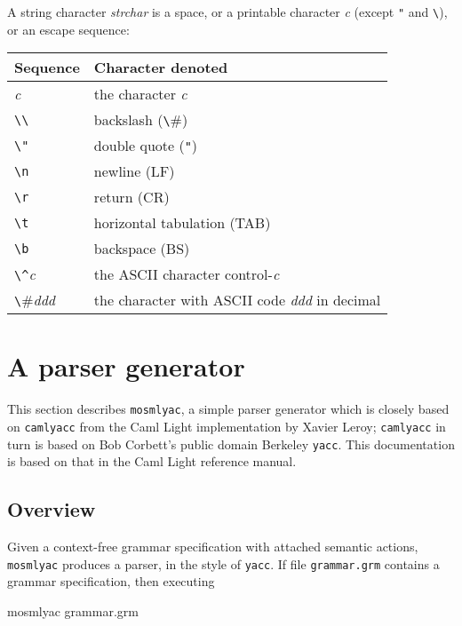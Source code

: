 \documentclass[fleqn]{article}
\begin{document}
\noindent A string character {\it strchar\/} is a space, or a
printable character {\it c\/} (except {\tt "} and \verb#\#), or an
escape sequence:

\begin{quot}
\begin{tabular}{@{}|l|l|}\hline
Sequence & Character denoted \\\hline
{\it c\/}       & the character {\it c\/}\\
\verb#\\#       & backslash (\verb#\#)\\
\verb#\"#       & double quote (\verb#"#)\\
\verb#\n#       & newline (LF)\\
\verb#\r#       & return (CR)\\
\verb#\t#       & horizontal tabulation (TAB)\\
\verb#\b#       & backspace (BS)\\
\verb#\^#{\it c\/}      & the ASCII character control-{\it c\/}\\
\verb#\#{\it ddd\/}     & the character with ASCII code {\it ddd\/} in
decimal\\\hline 
\end{tabular}
\end{quot}

\newpage

\section{A parser generator}
\label{sec-mosmlyac}

This section describes {\tt mosmlyac}, a simple parser generator which
is closely based on {\tt camlyacc} from the Caml Light implementation
by Xavier Leroy; {\tt camlyacc} in turn is based on Bob Corbett's
public domain Berkeley {\tt yacc}.  This documentation is based on
that in the Caml Light reference manual.


\subsection{Overview}

Given a context-free grammar specification with attached semantic
actions, {\tt mosmlyac} produces a parser, in the style of {\tt yacc}.
If file {\tt grammar.grm} contains a grammar specification, then
executing

\begin{program}
mosmlyac grammar.grm  
\end{program}
\end{document}
